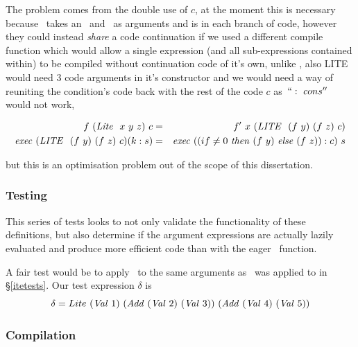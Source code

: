 \documentclass {article}
\begin{document}
The problem comes from the double use of $c$,
at the moment this is necessary because \compp\
takes an \expr\ and \code\ as arguments and is in
each branch of code,
however they could instead \emph{share}
a code continuation if we used a different compile function
which would allow a single expression 
(and all sub-expressions contained within)  
to be compiled without continuation code of it's own,
unlike \compp, also LITE would need 3 code arguments in
it's constructor and we would need a way of 
reuniting the condition's code back with the rest of the code $c$
as~$``:\ cons''$ would not work,

\begin{eqnarray*}
f\ (\mathit{Lite\ }\ x\ y\ z)\ c &=& f'\ x\ (\mathit{LITE\ }\ (f\ y)\ (f\ z)\ c) \\
\mathit{exec\ } (\mathit{LITE\ }\ (f\ y)\ (f\ z)\ c) (k : s) 
&=& \mathit{exec\ } ((if \not=0\ \mathit{then\ } (f\ y)\ \mathit{else\ } (f\ z)) : c)\ s 
\end{eqnarray*}

\noindent but this is an optimisation problem 
out of the scope of this dissertation.


\subsubsection{Testing}

This series of tests looks to not only
validate the functionality of these
definitions, but also determine
if the argument expressions are actually lazily evaluated
and produce more efficient code than with the eager
\ite\ function.

A fair test would be to apply \lite\ to 
the same arguments as \ite\ was applied to 
in \S\ref{itetests}. 
Our test expression $\delta$ is
\[ \delta = Lite\ (\Val 1)\
		 (\Add (\Val 2)\ (\Val 3))\ 
		(\Add (\Val 4)\ (\Val 5)) \]

\subsubsection{Compilation}
\end{document}
